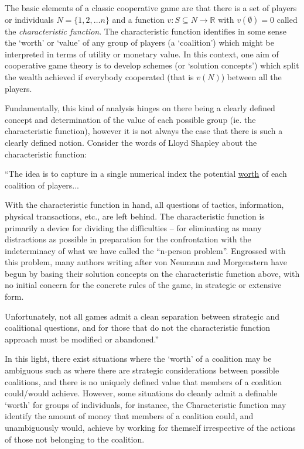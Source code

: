 The basic elements of a classic cooperative game are that there is a set of players or individuals $N=\{1,2,\dots n\}$ and a function $v: S\subseteq N \rightarrow \mathbb{R}$ with $v(\emptyset)=0$ called the \textit{characteristic function}.
The characteristic function identifies in some sense the `worth' or `value' of any group of players (a `coalition') which might be interpreted in terms of utility or monetary value.
In this context, one aim of cooperative game theory is to develop schemes (or `solution concepts') which split the wealth achieved if everybody cooperated (that is $v(N)$) between all the players.

Fundamentally, this kind of analysis hinges on there being a clearly defined concept and determination of the value of each possible group (ie. the characteristic function), however it is not always the case that there is such a clearly defined notion.
Consider the words of Lloyd Shapley about the characteristic function:

\begin{displayquote}
``The idea is to capture in a single numerical index the potential \underline{worth} of each coalition of players...

With the characteristic function in hand, all questions of tactics, information, physical transactions, etc., are left behind. The characteristic function is primarily a device for dividing the difficulties -- for eliminating as many distractions as possible in preparation for the confrontation with the indeterminacy of what we have called the ``n-person problem''. Engrossed with this problem, many authors writing after von Neumann and Morgenstern have begun by basing their solution concepts on the characteristic function above, with no initial concern for the concrete rules of the game, in strategic or extensive form.

Unfortunately, not all games admit a clean separation between strategic and coalitional questions, and for those that do not the characteristic function approach must be modified or abandoned.''\\
\citep{ShapleySchubikCharacteristicFunction}
\end{displayquote}

In this light, there exist situations where the `worth' of a coalition may be ambiguous such as where there are strategic considerations between possible coalitions, and there is no uniquely defined value that members of a coalition could/would achieve.
However, some situations do cleanly admit a definable `worth' for groups of individuals, for instance, the Characteristic function may identify the amount of money that members of a coalition could, and unambiguously would, achieve by working for themself irrespective of the actions of those not belonging to the coalition.

